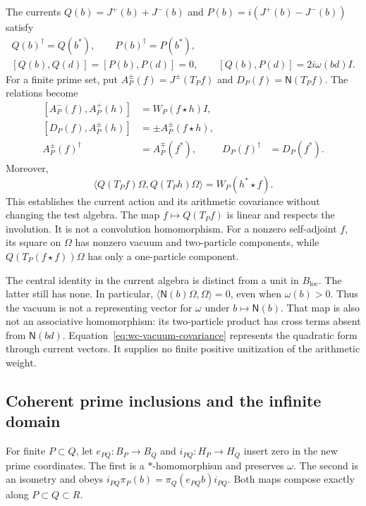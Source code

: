 The currents $Q(b)=J^+(b)+J^-(b)$ and
$P(b)=i(J^+(b)-J^-(b))$ satisfy
\[
 \begin{gathered}
 Q(b)^\dagger=Q(b^*),\qquad P(b)^\dagger=P(b^*),\\
 [Q(b),Q(d)]=[P(b),P(d)]=0,\qquad
 [Q(b),P(d)]=2i\omega(bd)I.
 \end{gathered}
\]
For a finite prime set, put
$A_P^\pm(f)=J^\pm(T_Pf)$ and $D_P(f)=\mathsf N(T_Pf)$.
The relations become
\begin{equation}
 \begin{aligned}
 [A_P^-(f),A_P^+(h)]&=W_P(f\star h)I,\\
 [D_P(f),A_P^\pm(h)]&=\pm A_P^\pm(f\star h),\\
 A_P^\pm(f)^\dagger&=A_P^\mp(f^*),&
 D_P(f)^\dagger&=D_P(f^*).
 \end{aligned}
 \label{eq:wc-native-current-relations}
\end{equation}
Moreover,
\begin{equation}
 \langle Q(T_Pf)\Omega,Q(T_Ph)\Omega\rangle
 =W_P(h^*\star f).
 \label{eq:wc-vacuum-covariance}
\end{equation}
This establishes the current action and its arithmetic covariance
without changing the test algebra.
The map $f\mapsto Q(T_Pf)$ is linear and respects the involution.
It is not a convolution homomorphism.
For a nonzero self-adjoint $f$, its square on $\Omega$ has nonzero
vacuum and two-particle components, while $Q(T_P(f\star f))\Omega$
has only a one-particle component.

The central identity in the current algebra is distinct from a unit in
$B_{\mathrm{loc}}$.  The latter still has none.
In particular, $\langle\mathsf N(b)\Omega,\Omega\rangle=0$, even when
$\omega(b)>0$.  Thus the vacuum is not a representing vector for
$\omega$ under $b\mapsto\mathsf N(b)$.
That map is also not an associative homomorphism: its two-particle
product has cross terms absent from $\mathsf N(bd)$.
Equation~\eqref{eq:wc-vacuum-covariance} represents the quadratic form
through current vectors.  It supplies no finite positive unitization
of the arithmetic weight.

\subsection{Coherent prime inclusions and the infinite domain}

For finite $P\subset Q$, let $e_{PQ}:B_P\to B_Q$ and
$i_{PQ}:H_P\to H_Q$ insert zero in the new prime coordinates.
The first is a $*$-homomorphism and preserves $\omega$.
The second is an isometry and obeys
$i_{PQ}\pi_P(b)=\pi_Q(e_{PQ}b)i_{PQ}$.
Both maps compose exactly along $P\subset Q\subset R$.

